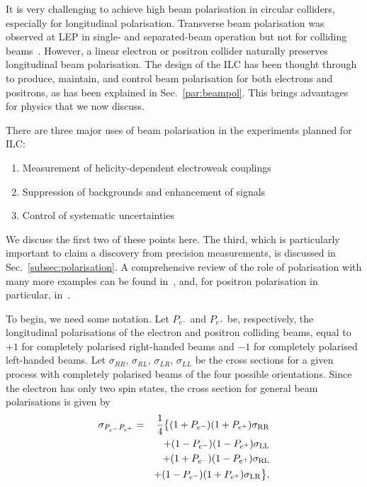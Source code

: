 It is very challenging to achieve high beam polarisation in circular colliders, especially for longitudinal polarisation.   Transverse beam polarisation was observed at LEP in single- and separated-beam operation but not for 
colliding beams~\cite{Assmann:1998qb}.  However,  a linear electron or positron
collider naturally preserves longitudinal beam polarisation.    The design of the 
ILC has been thought through  to produce, maintain, and control 
beam polarisation for both electrons and positrons, as has been explained in 
Sec.~\ref{par:beampol}.  This brings advantages for physics that we now discuss.

There are three major uses of beam polarisation in the experiments planned for ILC:
\begin{enumerate}
\item  Measurement of helicity-dependent electroweak couplings
\item Suppression of backgrounds and enhancement of signals
\item  Control of systematic uncertainties
\end{enumerate}
We discuss the first two of these points here.  The third, which is particularly 
important to claim a discovery from  precision measurements, is discussed in Sec.~\ref{subsec:polarisation}.  A comprehensive review of the role of polarisation with many more examples can be found in~\cite{MoortgatPick:2005cw}, and, for  positron polarisation in particular, in~\cite{Fujii:2018mli}. 

To begin, we need some notation. Let $P_{e^-}$ and $P_{e^+}$ be, respectively, the longitudinal polarisations of the electron and positron colliding beams, equal to $+1$ for completely polarised right-handed beams and $-1$ for completely polarised left-handed beams.   Let $\sigma_{RR}$, $\sigma_{RL}$, $\sigma_{LR}$, $\sigma_{LL}$ be the cross sections for a given process 
with completely polarised beams of the four possible orientations.  Since the electron has only two spin  states, the 
cross section for general beam  polarisations is given by 
\begin{eqnarray}
\sigma_{P_{e^-}P_{e^+}} &=& \frac{1}{4}\bigl\{
     (1+P_{e^-})(1+P_{e^+}) \sigma_{\mathrm{RR}}  \nonumber \\
&& + (1-P_{e^-})(1-P_{e^+}) \sigma_{\mathrm{LL}} \nonumber \\
&& + (1+P_{e^-})(1-P_{e^+}) \sigma_{\mathrm{RL}} \nonumber \\ 
&& + (1-P_{e^-})(1+P_{e^+}) \sigma_{\mathrm{LR}} \bigr\},
\label{eq:pol:xsec}
\end{eqnarray}

